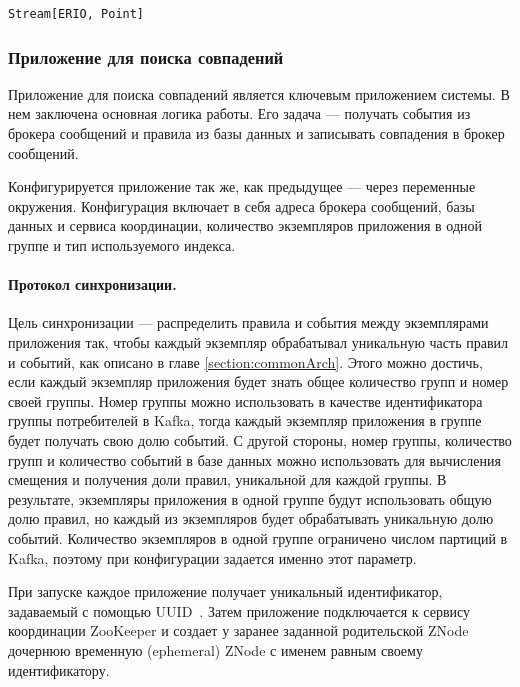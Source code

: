 \documentclass[14pt]{article}
\begin{document}
\begin{lstlisting}[style=scalaStyle,caption={Тип, описывающий поток событий.},label={listing:pointsStream},captionpos=b, float]
Stream[ERIO, Point]
\end{lstlisting}

\subsubsection{Приложение для поиска совпадений}
\label{section:classifier}

Приложение для поиска совпадений является ключевым приложением системы. В нем заключена основная логика работы. Его задача --- получать события из брокера сообщений и правила из базы данных и записывать совпадения в брокер сообщений.

Конфигурируется приложение так же, как предыдущее --- через переменные окружения. Конфигурация включает в себя адреса брокера сообщений, базы данных и сервиса координации, количество экземпляров приложения в одной группе и тип используемого индекса.

\paragraph{Протокол синхронизации.} Цель синхронизации --- распределить правила и события между экземплярами приложения так, чтобы каждый экземпляр обрабатывал уникальную часть правил и событий, как описано в главе \ref{section:commonArch}. Этого можно достичь, если каждый экземпляр приложения будет знать общее количество групп и номер своей группы. Номер группы можно использовать в качестве идентификатора группы потребителей в Kafka, тогда каждый экземпляр приложения в группе будет получать свою долю событий. С другой стороны, номер группы, количество групп и количество событий в базе данных можно использовать для вычисления смещения и получения доли правил, уникальной для каждой группы. В результате, экземпляры приложения в одной группе будут использовать общую долю правил, но каждый из экземпляров будет обрабатывать уникальную долю событий. Количество экземпляров в одной группе ограничено числом партиций в Kafka, поэтому при конфигурации задается именно этот параметр.

При запуске каждое приложение получает уникальный идентификатор, задаваемый с помощью UUID~\cite{uuid}. Затем приложение подключается к сервису координации ZooKeeper и создает у заранее заданной родительской ZNode дочернюю временную (ephemeral) ZNode с именем равным своему идентификатору.
\end{document}
